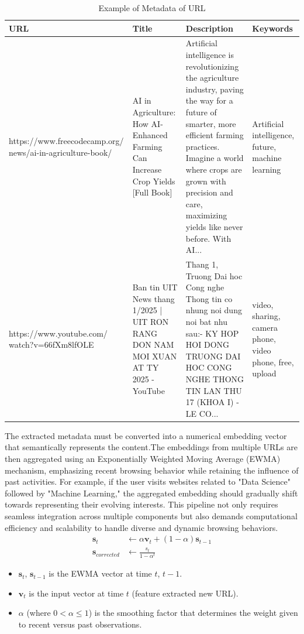 \documentclass{article}
\begin{document}
\begin{table}[H]
\centering
\begin{tabular}{|p{}|p{}|p{}|p{}|}
\hline
URL & Title & Description & Keywords \\
\hline
{\raggedright
https://www.freecodecamp.org/
news/ai-in-agriculture-book/
\par
}
&
AI in Agriculture: How AI-Enhanced Farming Can Increase Crop Yields [Full Book]
&
Artificial intelligence is revolutionizing the agriculture industry, paving the way for a future of smarter, more efficient farming practices. Imagine a world where crops are grown with precision and care, maximizing yields like never before. With AI...	
&
Artificial intelligence, future, machine learning
\\
\hline
https://www.youtube.com/ watch?v=66fXm8lfOLE
&
Ban tin UIT News thang 1/2025 | UIT RON RANG DON NAM MOI XUAN AT TY 2025 - YouTube
&
Thang 1, Truong Dai hoc Cong nghe Thong tin co nhung noi dung noi bat nhu sau:- KY HOP HOI DONG TRUONG DAI HOC CONG NGHE THONG TIN LAN THU 17 (KHOA I) - LE CO...
&
video, sharing, camera phone, video phone, free, upload\\
\hline
\end{tabular}
\caption{Example of Metadata of URL}
\label{table:metadata-url}
\end{table}

The extracted metadata must be converted into a numerical embedding vector that semantically represents the content.The embeddings from multiple URLs are then aggregated using an Exponentially Weighted Moving Average (EWMA) mechanism, emphasizing recent browsing behavior while retaining the influence of past activities. For example, if the user visits websites related to "Data Science" followed by "Machine Learning," the aggregated embedding should gradually shift towards representing their evolving interests. This pipeline not only requires seamless integration across multiple components but also demands computational efficiency and scalability to handle diverse and dynamic browsing behaviors. 
\begin{align*}
\mathbf{s}_t &\leftarrow \alpha \mathbf{v}_t + (1 - \alpha) \mathbf{s}_{t-1} \\
\mathbf{s}_{corrected} &\leftarrow \frac{s_t}{1-\alpha^t}
\end{align*}

\begin{itemize}
    \item $\mathbf{s}_{t}$, $\mathbf{s}_{t-1}$ is the EWMA vector at time $t$, $t-1$.
    \item $\mathbf{v}_t$ is the input vector at time $t$ (feature extracted new URL).
    \item $\alpha$ (where $0 < \alpha \leq 1$) is the smoothing factor that determines the weight given to recent versus past observations.
\end{itemize}
\end{document}
